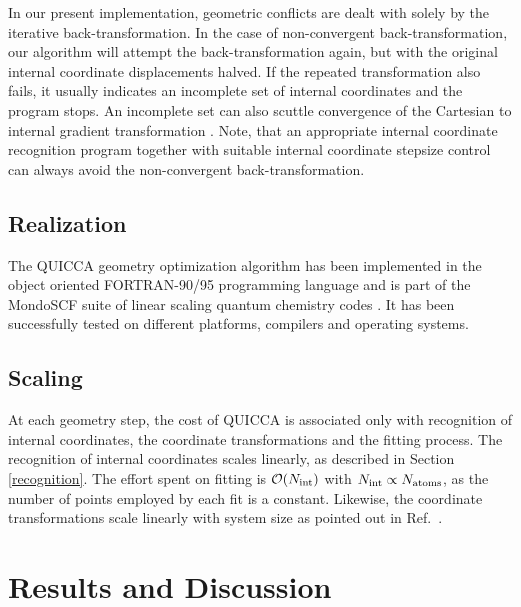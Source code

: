 \documentclass[prl,aps,preprint,superbib,12pt]{revtex4}
\begin{document}
In our present implementation, geometric conflicts are dealt with solely by the iterative back-transformation.
In the case of non-convergent back-transformation,  our algorithm will attempt the back-transformation
again, but with the original internal coordinate displacements halved.  If the repeated transformation 
also fails, it usually indicates an incomplete set of internal coordinates and the program stops.  An incomplete 
set can also scuttle convergence of the Cartesian to internal gradient transformation \cite{KNemeth00}. 
Note, that an appropriate internal coordinate recognition program 
together with suitable internal coordinate stepsize control
can always avoid the non-convergent back-transformation.

\subsection{Realization}

The QUICCA geometry optimization algorithm has been implemented in the
object oriented FORTRAN-90/95 programming language and is part of
the MondoSCF suite of linear scaling quantum chemistry codes \cite{MondoSCF}.
It has been successfully tested on different platforms, compilers and operating
systems. 

\subsection{Scaling}

At each geometry step, the cost of QUICCA is associated only with 
recognition of internal coordinates, the coordinate 
transformations and the fitting process. The recognition of internal 
coordinates scales linearly, as described in Section \ref{recognition}.  
The effort spent on fitting is $ {\cal O}(N_{\rm int})$ with $N_{\rm int} \propto N_{\rm atoms}$, as the number of 
points employed by each fit is a constant.  Likewise, the coordinate transformations scale linearly with system 
size as pointed out in Ref.~.


\section{Results and Discussion} \label{Sresults}
\end{document}
